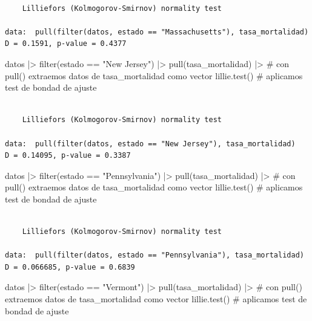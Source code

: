 \documentclass[
  spanish,
  a4paper,
]{scrbook}
\newenvironment{Shaded}{\begin{snugshade}}{\end{snugshade}}
\newcommand{\CommentTok}[1]{\textcolor[rgb]{0.37,0.37,0.37}{#1}}
\newcommand{\FunctionTok}[1]{\textcolor[rgb]{0.28,0.35,0.67}{#1}}
\newcommand{\NormalTok}[1]{\textcolor[rgb]{0.00,0.23,0.31}{#1}}
\newcommand{\SpecialCharTok}[1]{\textcolor[rgb]{0.37,0.37,0.37}{#1}}
\newcommand{\StringTok}[1]{\textcolor[rgb]{0.13,0.47,0.30}{#1}}
\begin{document}
\begin{verbatim}

    Lilliefors (Kolmogorov-Smirnov) normality test

data:  pull(filter(datos, estado == "Massachusetts"), tasa_mortalidad)
D = 0.1591, p-value = 0.4377
\end{verbatim}

\begin{Shaded}
\begin{Highlighting}[]
\NormalTok{datos }\SpecialCharTok{|\textgreater{}}
  \FunctionTok{filter}\NormalTok{(estado }\SpecialCharTok{==} \StringTok{"New Jersey"}\NormalTok{) }\SpecialCharTok{|\textgreater{}}
  \FunctionTok{pull}\NormalTok{(tasa\_mortalidad) }\SpecialCharTok{|\textgreater{}} \CommentTok{\# con pull() extraemos datos de tasa\_mortalidad como vector}
  \FunctionTok{lillie.test}\NormalTok{() }\CommentTok{\# aplicamos test de bondad de ajuste}
\end{Highlighting}
\end{Shaded}

\begin{verbatim}

    Lilliefors (Kolmogorov-Smirnov) normality test

data:  pull(filter(datos, estado == "New Jersey"), tasa_mortalidad)
D = 0.14095, p-value = 0.3387
\end{verbatim}

\begin{Shaded}
\begin{Highlighting}[]
\NormalTok{datos }\SpecialCharTok{|\textgreater{}}
  \FunctionTok{filter}\NormalTok{(estado }\SpecialCharTok{==} \StringTok{"Pennsylvania"}\NormalTok{) }\SpecialCharTok{|\textgreater{}}
  \FunctionTok{pull}\NormalTok{(tasa\_mortalidad) }\SpecialCharTok{|\textgreater{}} \CommentTok{\# con pull() extraemos datos de tasa\_mortalidad como vector}
  \FunctionTok{lillie.test}\NormalTok{() }\CommentTok{\# aplicamos test de bondad de ajuste}
\end{Highlighting}
\end{Shaded}

\begin{verbatim}

    Lilliefors (Kolmogorov-Smirnov) normality test

data:  pull(filter(datos, estado == "Pennsylvania"), tasa_mortalidad)
D = 0.066685, p-value = 0.6839
\end{verbatim}

\begin{Shaded}
\begin{Highlighting}[]
\NormalTok{datos }\SpecialCharTok{|\textgreater{}}
  \FunctionTok{filter}\NormalTok{(estado }\SpecialCharTok{==} \StringTok{"Vermont"}\NormalTok{) }\SpecialCharTok{|\textgreater{}}
  \FunctionTok{pull}\NormalTok{(tasa\_mortalidad) }\SpecialCharTok{|\textgreater{}} \CommentTok{\# con pull() extraemos datos de tasa\_mortalidad como vector}
  \FunctionTok{lillie.test}\NormalTok{() }\CommentTok{\# aplicamos test de bondad de ajuste}
\end{Highlighting}
\end{Shaded}
\end{document}
